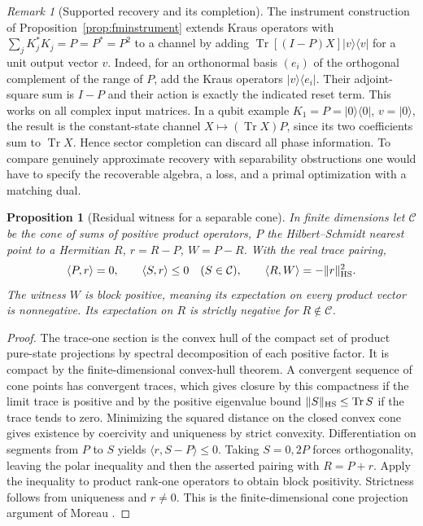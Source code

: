 \documentclass[aps,pra,onecolumn,superscriptaddress,nofootinbib,10pt]{revtex4-2}
\newtheorem{proposition}[theorem]{Proposition}
\theoremstyle{definition}
\theoremstyle{remark}
\newtheorem{remark}[theorem]{Remark}
\newcommand{\tr}{\operatorname{Tr}}
\begin{document}
\begin{remark}[Supported recovery and its completion]\label{ob:completionrecovery}
The instrument construction of Proposition~\ref{prop:fminstrument}
extends Kraus operators with
\(\sum_jK_j^*K_j=P=P^*=P^2\) to a channel by adding
\(\tr[(I-P)X]|v\rangle\langle v|\) for a unit output vector \(v\).
Indeed, for an orthonormal basis $(e_i)$ of the orthogonal
complement of the range of $P$, add the Kraus operators
$|v\rangle\langle e_i|$. Their adjoint-square sum is $I-P$
and their action is exactly the indicated reset term.
This works on all complex input matrices. In a qubit example
\(K_1=P=|0\rangle\langle0|\), \(v=|0\rangle\), the result is the
constant-state channel \(X\mapsto(\tr X)P\), since its two coefficients
sum to \(\tr X\). Hence sector completion can discard all phase
information. To compare genuinely approximate recovery with separability
obstructions one would have to specify the recoverable algebra, a loss,
and a primal optimization with a matching dual.
\end{remark}

\begin{proposition}[Residual witness for a separable cone]\label{ob:separableresidual}
In finite dimensions let \(\mathcal C\) be the cone of sums of
positive product operators, \(P\) the Hilbert--Schmidt nearest point
to a Hermitian \(R\), \(r=R-P\), \(W=P-R\). With the real trace pairing,
\[
 \langle P,r\rangle=0,\qquad
 \langle S,r\rangle\le0\quad(S\in\mathcal C),\qquad
 \langle R,W\rangle=-\|r\|_{\rm HS}^2.
\]
The witness \(W\) is block positive, meaning its expectation on every
product vector is nonnegative. Its expectation on \(R\) is strictly
negative for \(R\notin\mathcal C\).
\end{proposition}
\begin{proof}
The trace-one section is the convex hull of the compact set of
product pure-state projections by spectral decomposition of each
positive factor. It is compact by the finite-dimensional convex-hull
theorem. A convergent sequence of cone points has convergent traces,
which gives closure by this compactness if the limit trace is
positive and by the positive eigenvalue bound
\(\|S\|_{\rm HS}\le\tr S\) if the trace tends to zero.
Minimizing the squared distance on the closed convex cone gives
existence by coercivity and uniqueness by strict convexity.
Differentiation on segments from \(P\) to \(S\) yields
\(\langle r,S-P\rangle\le0\). Taking \(S=0,2P\) forces
orthogonality, leaving the polar inequality and then the asserted
pairing with \(R=P+r\). Apply the inequality to product rank-one
operators to obtain block positivity. Strictness follows from
uniqueness and \(r\ne0\). This is the finite-dimensional cone
projection argument of Moreau \cite{obr:moreau}.
\end{proof}
\end{document}

